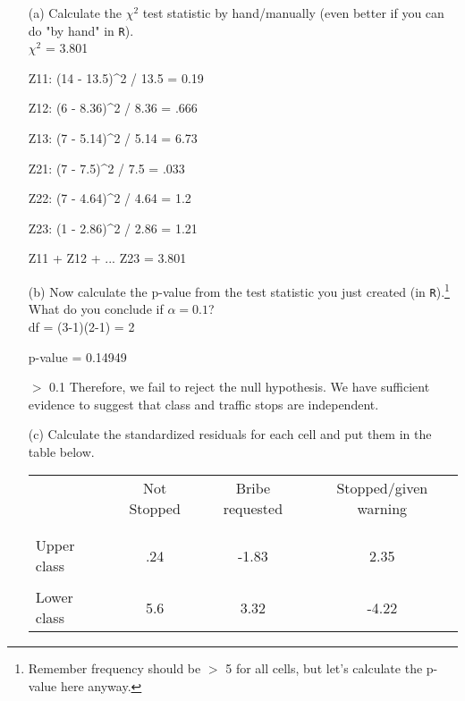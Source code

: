 \documentclass[12pt,letterpaper]{article}
\begin{document}
\begin{enumerate}
	
	\item [(a)]
	Calculate the $\chi^2$ test statistic by hand/manually (even better if you can do "by hand" in \texttt{R}).\\

	\noindent $\chi^2$ = 3.801

\vspace{1cm}
	\noindent Z11: (14 - 13.5)^2 / 13.5 = 0.19 
	
	\noindent Z12: (6 - 8.36)^2 / 8.36 = .666
	
	\noindent Z13: (7 - 5.14)^2 / 5.14 = 6.73
	
	\noindent Z21: (7 - 7.5)^2 / 7.5 = .033
	
	\noindent Z22: (7 - 4.64)^2 / 4.64 = 1.2
	
	\noindent Z23: (1 - 2.86)^2 / 2.86 = 1.21

	\vspace{1cm}
	
	\noindent Z11 + Z12 + ... Z23 = 3.801
	
	\vspace{4cm}
	
	
	\item [(b)]
	Now calculate the p-value from the test statistic you just created (in \texttt{R}).\footnote{Remember frequency should be $>$ 5 for all cells, but let's calculate the p-value here anyway.}  What do you conclude if $\alpha = 0.1$?\\
	
	\noindent df = (3-1)(2-1) = 2   

	\noindent p-value = 0.14949
	
	 $>$ 0.1
	Therefore, we fail to reject the null hypothesis. We have sufficient evidence to suggest that class and traffic stops are independent. 
	
	\newpage
	\item [(c)] Calculate the standardized residuals for each cell and put them in the table below.
	\vspace{1cm}
	
	\begin{table}[h]
		\centering
		\begin{tabular}{l | c c c }
			& Not Stopped & Bribe requested & Stopped/given warning \\
			\\[-1.8ex] 
			\hline \\[-1.8ex]
			Upper class  & .24 & -1.83 & 2.35  \\
			\\
			Lower class & 5.6 & 3.32  & -4.22  \\
			

\end{tabular}
\end{table}
\end{enumerate}
\end{document}
